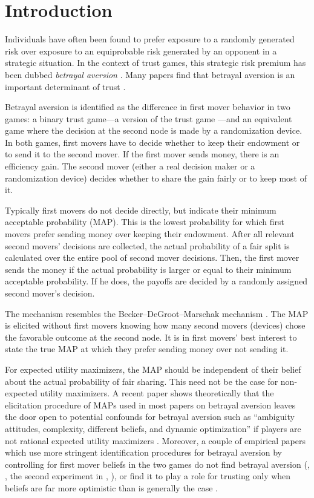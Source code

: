 \section{Introduction}\label{sec:intro}
Individuals have often been found to prefer exposure to a randomly generated risk over exposure to an equiprobable risk generated by an opponent in a strategic situation.
In the context of trust games, this strategic risk premium has been dubbed \textit{betrayal aversion} \citep{Bohnet2004}.
Many papers find that betrayal aversion is an important determinant of trust \citep{Bohnet2004, Aimone2015, Fairley2016, Quercia2016, Bacine2018, Butler2018, Polipciuc2022motive}.

Betrayal aversion is identified as the difference in first mover behavior in two games: a binary trust game---a version of the trust game \citep{Berg1995}---and an equivalent game where the decision at the second node is made by a randomization device.
In both games, first movers have to decide whether to keep their endowment or to send it to the second mover.
If the first mover sends money, there is an efficiency gain.
The second mover (either a real decision maker or a randomization device) decides whether to share the gain fairly or to keep most of it.

Typically first movers do not decide directly, but indicate their minimum acceptable probability (MAP).
This is the lowest probability for which first movers prefer sending money over keeping their endowment.
After all relevant second movers' decisions are collected, the actual probability of a fair split is calculated over the entire pool of second mover decisions.
Then, the first mover sends the money if the actual probability is larger or equal to their minimum acceptable probability.
If he does, the payoffs are decided by a randomly assigned second mover's decision.

The mechanism resembles the Becker--DeGroot--Marschak mechanism \citep[in short, BDM]{Becker1964}.
The MAP is elicited without first movers knowing how many second movers (devices) chose the favorable outcome at the second node.
It is in first movers' best interest to state the true MAP at which they prefer sending money over not sending it.

For expected utility maximizers, the MAP should be independent of their belief about the actual probability of fair sharing.
This need not be the case for non-expected utility maximizers.
A recent paper shows theoretically that the elicitation procedure of MAPs used in most papers on betrayal aversion leaves the door open to potential confounds for betrayal aversion such as ``ambiguity attitudes, complexity, different beliefs, and dynamic optimization'' if players are not rational expected utility maximizers \citep{Li2020a}.
Moreover, a couple of empirical papers which use more stringent identification procedures for betrayal aversion by controlling for first mover beliefs in the two games do not find betrayal aversion (\citeauthor{Fetchenhauer2012}, \citeyear{Fetchenhauer2012}, the second experiment in \citeauthor{Polipciuc2022inout}, \citeyear{Polipciuc2022inout}), or find it to play a role for trusting only when beliefs are far more optimistic than is generally the case \citep{Engelmann2021}.

